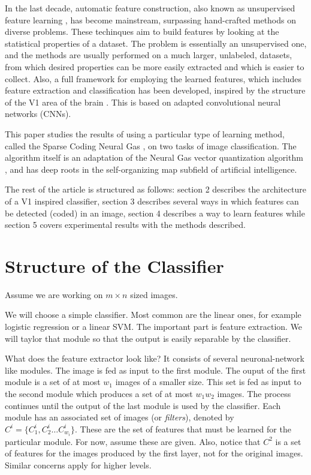 \documentclass[runningheads,a4paper]{llncs}
\newcommand{\hctimes}[2]{{#1}\!\times\!{#2}}
\begin{document}
In the last decade, automatic feature construction, also known as unsupervised feature learning \cite{u1,u2,u3}, has become mainstream, surpassing hand-crafted methods on diverse problems. These techinques aim to build features by looking at the statistical properties of a dataset. The problem is essentially an unsupervised one, and the methods are usually performed on a much larger, unlabeled, datasets, from which desired properties can be more easily extracted and which is easier to collect. Also, a full framework for employing the learned features, which includes feature extraction and classification has been developed, inspired by the structure of the V1 area of the brain \cite{u1,u2,u3}. This is based on adapted convolutional neural networks (CNNs).

This paper studies the results of using a particular type of learning method, called the Sparse Coding Neural Gas \cite{u1,u2,u3}, on two tasks of image classification. The algorithm itself is an adaptation of the Neural Gas vector quantization algorithm \cite{neuralgas1,neuralgas2}, and has deep roots in the self-organizing map subfield of artificial intelligence.

The rest of the article is structured as follows: section 2 describes the architecture of a V1 inspired classifier, section 3 describes several ways in which features can be detected (coded) in an image, section 4 describes a way to learn features while section 5 covers experimental results with the methods described.

\section{Structure of the Classifier}

Assume we are working on $\hctimes{m}{n}$ sized images.

We will choose a simple classifier. Most common are the linear ones, for example logistic regression or a linear SVM. The important part is feature extraction. We will taylor that module so that the output is easily separable by the classifier.

What does the feature extractor look like? It consists of several neuronal-network like modules. The image is fed as input to the first module. The ouput of the first module is a set of at most $w_1$ images of a smaller size. This set is fed as input to the second module which produces a set of at most $w_1w_2$ images. The process continues until the output of the last module is used by the classifier. Each module has an associated set of images (or \emph{filters}), denoted by $C^i = \{ C^i_1 , C^i_2 \dots C^i_{w_i} \}$. These are the set of features that must be learned for the particular module. For now, assume these are given. Also, notice that $C^2$ is a set of features for the images produced by the first layer, not for the original images. Similar concerns apply for higher levels.
\end{document}
